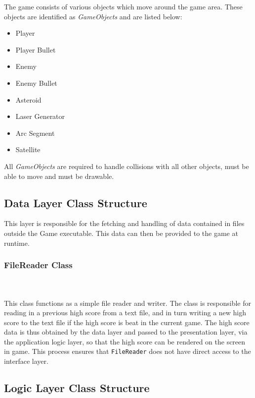\documentclass[10pt,twocolumn]{witseiepaper}
\begin{document}
The game consists of various objects which move around the game area. These objects are identified as \textit{GameObjects} and are listed below:
\begin{itemize}
	\item Player
	\item Player Bullet
	\item Enemy
	\item Enemy Bullet
	\item Asteroid
	\item Laser Generator
	\item Arc Segment
	\item Satellite
\end{itemize}

All \textit{GameObjects} are required to handle collisions with all other objects, must be able to move and must be drawable. 



\subsection{Data Layer Class Structure}

This layer is responsible for the fetching and handling of data contained in files outside the Game executable. This data can then be provided to the game at runtime.

\subsubsection{FileReader Class}
~\\
~\\
This class functions as a simple file reader and writer. The class is responsible for reading in a previous high score from a text file, and in turn writing a new high score to the text file if the high score is beat in the current game. The high score data is thus obtained by the data layer and passed to the presentation layer, via the application logic layer, so that the high score can be rendered on the screen in game. This process ensures that \texttt{FileReader} does not have direct access to the interface layer.

\subsection{Logic Layer Class Structure}
\end{document}
